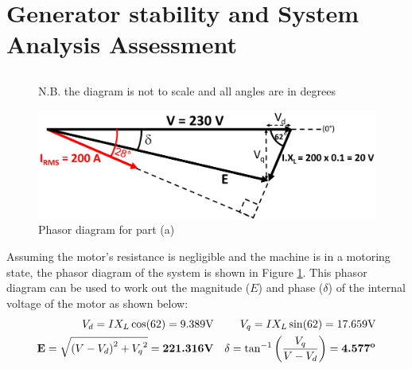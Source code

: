 \newpage
\section{Generator stability and System Analysis Assessment}
\renewcommand{\thesubsection}{\thesection.\alph{subsection}}
    \subsection{}
        \begin{figure}[tbh!]
            \centering
            \caption*{N.B. the diagram is not to scale and all angles are in degrees}
            \includegraphics[width=\linewidth]{PEMDT Exam Report/img/Phasor Diagram.png}
            \caption{Phasor diagram for part (a)}
            \label{fig: phasor diagram}
        \end{figure}

        Assuming the motor's resistance is negligible and the machine is in a motoring state, the phasor diagram of the system is shown in Figure \ref{fig: phasor diagram}. This phasor diagram can be used to work out the magnitude (\(E\)) and phase (\(\delta\)) of the internal voltage of the motor as shown below:
        \begin{align}
            V_d = IX_L \cos(62) = 9.389 \text{V} && V_q = IX_L \sin(62) = 17.659 \text{V} \\
            \textbf{E} = \sqrt{\left(V - V_d\right)^2 + {V_{q}}^2} = \textbf{221.316} \text{\textbf{V}} && \delta = \tan^{-1}\left(\frac{V_q}{V - V_d}\right) = \textbf{4.577}^\textbf{o}
        \end{align}

